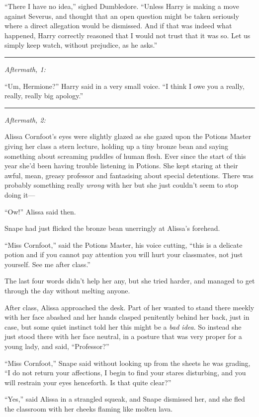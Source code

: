 ``There I have no idea,'' sighed Dumbledore. ``Unless Harry is making a
move against Severus, and thought that an open question might be taken
seriously where a direct allegation would be dismissed. And if that was
indeed what happened, Harry correctly reasoned that I would not trust
that it was so. Let us simply keep watch, without prejudice, as he
asks.''

\begin{center}\rule{3in}{0.4pt}\end{center}

\emph{Aftermath, 1:}

``Um, Hermione?'' Harry said in a very small voice. ``I think I owe you
a really, really, really big apology.''

\begin{center}\rule{3in}{0.4pt}\end{center}

\emph{Aftermath, 2:}

Alissa Cornfoot's eyes were slightly glazed as she gazed upon the
Potions Master giving her class a stern lecture, holding up a tiny
bronze bean and saying something about screaming puddles of human flesh.
Ever since the start of this year she'd been having trouble listening in
Potions. She kept staring at their awful, mean, greasy professor and
fantasising about special detentions. There was probably something
really \emph{wrong} with her but she just couldn't seem to stop doing
it---

``Ow!'' Alissa said then.

Snape had just flicked the bronze bean unerringly at Alissa's forehead.

``Miss Cornfoot,'' said the Potions Master, his voice cutting, ``this is
a delicate potion and if you cannot pay attention you will hurt your
classmates, not just yourself. See me after class.''

The last four words didn't help her any, but she tried harder, and
managed to get through the day without melting anyone.

After class, Alissa approached the desk. Part of her wanted to stand
there meekly with her face abashed and her hands clasped penitently
behind her back, just in case, but some quiet instinct told her this
might be a \emph{bad idea}. So instead she just stood there with her
face neutral, in a posture that was very proper for a young lady, and
said, ``Professor?''

``Miss Cornfoot,'' Snape said without looking up from the sheets he was
grading, ``I do not return your affections, I begin to find your stares
disturbing, and you will restrain your eyes henceforth. Is that quite
clear?''

``Yes,'' said Alissa in a strangled squeak, and Snape dismissed her, and
she fled the classroom with her cheeks flaming like molten lava.
